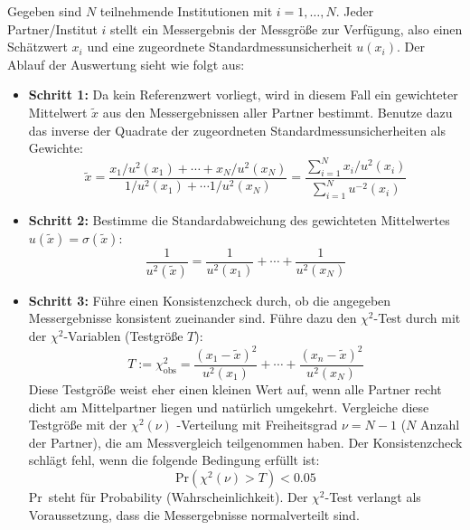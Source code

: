Gegeben sind $N$ teilnehmende Institutionen mit $i=1,\dots,N$. Jeder
Partner/Institut $i$ stellt ein Messergebnis der Messgröße zur Verfügung, also einen Schätzwert $x_i$ und eine zugeordnete Standardmessunsicherheit
$u(x_i)$.
Der Ablauf der Auswertung sieht wie folgt aus:
\begin{itemize}
\item \textbf{Schritt 1:}  \newline
Da kein Referenzwert vorliegt, wird in diesem Fall ein gewichteter Mittelwert $\tilde x$ aus den Messergebnissen aller Partner bestimmt. Benutze dazu das inverse der Quadrate der zugeordneten Standardmessunsicherheiten als Gewichte: 
\begin{equation}
\tilde x = \frac{x_1/u^2(x_1)+ \cdots + x_N/u^2(x_N)}{1/u^2(x_1)+ \cdots 1/u^2(x_N)} = \frac{\sum\limits_{i=1}^{N} x_i / u^2(x_i)}
{\sum\limits_{i=1}^{N} u^{-2}(x_i)}
\label{eq:referenzgleichepartner}
\end{equation}
\item \textbf{Schritt 2:}  \newline
Bestimme die Standardabweichung des gewichteten Mittelwertes $u(\tilde x)=\sigma(\tilde x)$:
\begin{equation}
\frac{1}{u^2(\tilde x)} = \frac{1}{u^2(x_1)} +\cdots + \frac{1}{u^2(x_N)}
\label{eq:Standardabweichung_Mittelwert}
\end{equation}
\item \textbf{Schritt 3:}  \newline
Führe einen Konsistenzcheck durch, ob die angegeben Messergebnisse
konsistent zueinander sind. Führe dazu den $\chi^2$-Test
durch mit der $\chi^2$-Variablen (Testgröße $T$): 
\begin{equation}
T := \chi^2_\mathrm{obs} = \frac{(x_1 - \tilde x)^2}{u^2(x_1)} + \cdots + 
\frac{(x_n-\tilde x)^2}{u^2(x_N)}
\label{eq:T_for_consistencecheck}
\end{equation}
Diese Testgröße weist eher einen kleinen Wert auf, wenn alle Partner 
recht dicht am Mittelpartner liegen und natürlich umgekehrt. 
Vergleiche diese Testgröße mit der $\chi^2 (\nu)$ -Verteilung 
mit Freiheitsgrad $\nu = N-1$ ($N$ Anzahl der Partner), 
die am Messvergleich teilgenommen haben. 
Der Konsistenzcheck schlägt fehl, wenn die folgende Bedingung
erfüllt ist: 
\begin{equation}
\mathrm{Pr}\left(\chi^2(\nu) > T\right) < 0.05
\label{eq:consistencecheck}
\end{equation}
\glqq Pr\grqq~steht für \glqq Probability (Wahrscheinlichkeit)\grqq.
Der $\chi^2$-Test verlangt als Voraussetzung, dass die Messergebnisse
normalverteilt sind. 


\end{itemize}
